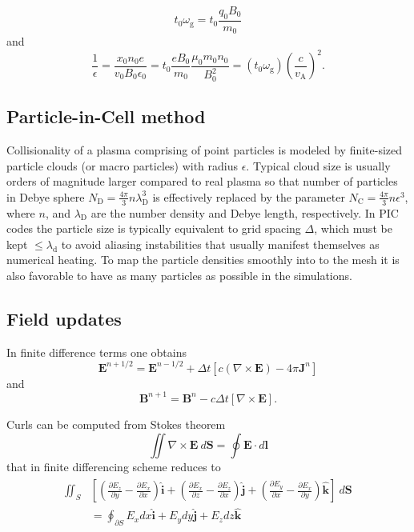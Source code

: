\documentclass{aa}
\newcommand{\be}{\begin{equation}}
\newcommand{\ee}{\end{equation}}
\renewcommand{\vec}[1]{\ensuremath{\boldsymbol{#1}}}
\newcommand{\dt}{\ensuremath{\Delta t}}
\begin{document}
\be
t_0 \omega_{\mathrm{g}} = t_0 \frac{q_0 B_0}{m_0}
\ee
and
\be
\frac{1}{\epsilon} = \frac{x_0 n_0 e}{v_0 B_0 \epsilon_0} = t_0 \frac{e B_0}{m_0} \frac{\mu_0 m_0 n_0}{B_0^2} = (t_0 \omega_{\mathrm{g}})\left( \frac{c}{v_{\mathrm{A}}} \right)^2.
\ee

\subsection{Particle-in-Cell method}

Collisionality of a plasma comprising of point particles is modeled by finite-sized particle clouds (or macro particles) with radius $\epsilon$.
Typical cloud size is usually orders of magnitude larger compared to real plasma so that number of particles in Debye sphere $N_{\mathrm{D}} = \frac{4 \pi}{3}n\lambda_{\mathrm{D}}^3$ is effectively replaced by the parameter $N_{\mathrm{C}} = \frac{4 \pi}{3}n\epsilon^3$, where $n$, and $\lambda_{\mathrm{D}}$ are the number density and Debye length, respectively.
In PIC codes the particle size is typically equivalent to grid spacing $\Delta$, which must be kept $\le \lambda_{\mathrm{d}}$ to avoid aliasing instabilities that usually manifest themselves as numerical heating.
To map the particle densities smoothly into to the mesh it is also favorable to have as many particles as possible in the simulations.

\subsection{Field updates}
In finite difference terms one obtains 
\be
\vec{E}^{n+1/2} = \vec{E}^{n-1/2} + \dt [c(\nabla \times \vec{E}) - 4\pi \vec{J}^n]
\ee
and
\be
\vec{B}^{n+1} = \vec{B}^n - c \dt [\nabla \times \vec{E}].
\ee

Curls can be computed from Stokes theorem
\be
\iint \nabla \times \vec{E} ~d\vec{S} = \oint \vec{E} \cdot d\vec{l}
\ee
that in finite differencing scheme reduces to 
\begin{align}\begin{split}
\iint_{S}& \left[  \left( \frac{\partial E_z}{\partial y} - \frac{\partial E_x}{\partial x} \right) \vec{\hat{i}} + 
\left( \frac{\partial E_x}{\partial z} - \frac{\partial E_z}{\partial x} \right) \vec{\hat{j}} + 
\left( \frac{\partial E_y}{\partial x} - \frac{\partial E_x}{\partial y} \right) \vec{\hat{k}} \right] ~d\vec{S} \\
&= \oint_{\partial S} E_x dx \vec{\hat{i}} +  E_y dy \vec{\hat{j}} + E_z dz \vec{\hat{k}} \\
\end{split}\end{align}
\end{document}

